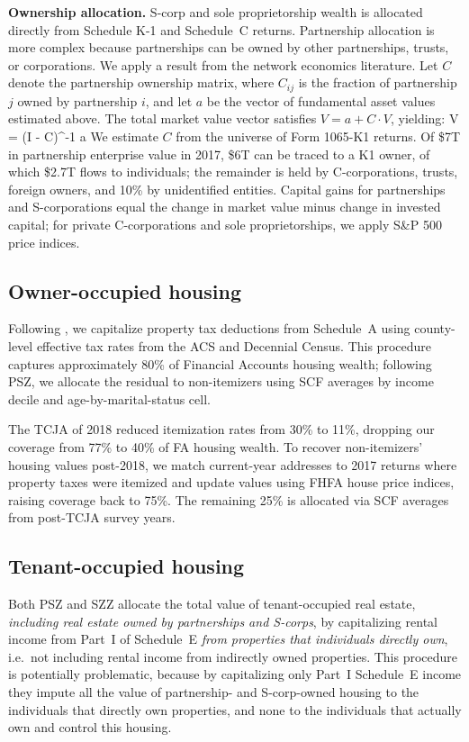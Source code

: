 \textbf{Ownership allocation.} S-corp and sole proprietorship wealth is allocated directly from Schedule K-1 and Schedule~C returns. Partnership allocation is more complex because partnerships can be owned by other partnerships, trusts, or corporations. We apply a result from the network economics literature. Let $C$ denote the partnership ownership matrix, where $C_{ij}$ is the fraction of partnership $j$ owned by partnership $i$, and let $a$ be the vector of fundamental asset values estimated above. The total market value vector satisfies $V = a + C \cdot V$, yielding:
\be
V = (I - C)^{-1} \cdot a
\label{eq:network}
\ee
We estimate $C$ from the universe of Form 1065-K1 returns. Of \$7T in partnership enterprise value in 2017, \$6T can be traced to a K1 owner, of which \$2.7T flows to individuals; the remainder is held by C-corporations, trusts, foreign owners, and 10\% by unidentified entities. Capital gains for partnerships and S-corporations equal the change in market value minus change in invested capital; for private C-corporations and sole proprietorships, we apply S\&P 500 price indices.

\subsection{Owner-occupied housing}

Following \citet{larrimore2021recent}, we capitalize property tax deductions from Schedule~A using county-level effective tax rates from the ACS and Decennial Census. This procedure captures approximately 80\% of Financial Accounts housing wealth; following PSZ, we allocate the residual to non-itemizers using SCF averages by income decile and age-by-marital-status cell.

The TCJA of 2018 reduced itemization rates from 30\% to 11\%, dropping our coverage from 77\% to 40\% of FA housing wealth. To recover non-itemizers' housing values post-2018, we match current-year addresses to 2017 returns where property taxes were itemized and update values using FHFA house price indices, raising coverage back to 75\%. The remaining 25\% is allocated via SCF averages from post-TCJA survey years.

\subsection{Tenant-occupied housing}

Both PSZ and SZZ allocate the total value of tenant-occupied real estate, \textit{including real estate owned by partnerships and S-corps}, by capitalizing rental income from Part~I of Schedule~E \textit{from properties that individuals directly own}, i.e.\ not including rental income from indirectly owned properties. This procedure is potentially problematic, because by capitalizing only Part~I Schedule~E income they impute all the value of partnership- and S-corp-owned housing to the individuals that directly own properties, and none to the individuals that actually own and control this housing.

